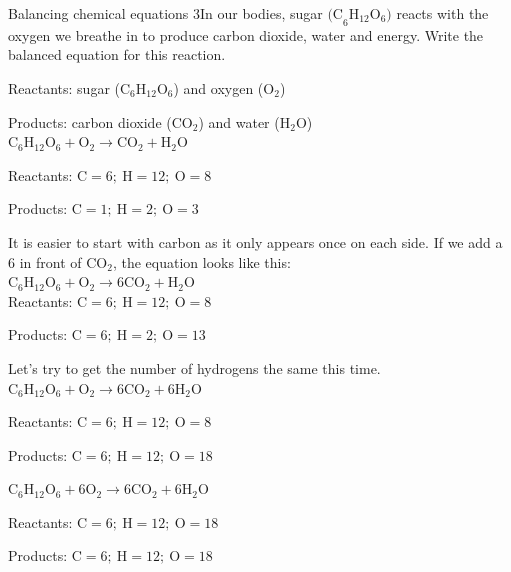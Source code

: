       \noindent
\par
            \label{m38726*secfhsst!!!underscore!!!id590}
      \noindent
\begin{wex}{Balancing chemical equations 3}{In our bodies, sugar ${\text{(C}_{6}\text{H}_{12}\text{O}_{6}\text{)}}$ reacts with the oxygen we breathe in to produce carbon dioxide, water and energy. Write the balanced equation for this reaction.}

{
Reactants: sugar (${\text{C}_{6}\text{H}_{12}\text{O}_{6}}$) and oxygen (${\text{O}_{2}}$)

Products: carbon dioxide (${\text{CO}_{2}}$) and water (${\text{H}_{2}\text{O}}$)\\

    $\text{C}_{6}\text{H}_{12}\text{O}_{6} + \text{O}_{2} \rightarrow \text{CO}_{2} + \text{H}_{2}\text{O}$

   Reactants: $\text{C} = 6;~ \text{H} = 12; ~\text{O} = 8$

   Products: $\text{C} = 1;~ \text{H} = 2; ~\text{O} = 3$

   It is easier to start with carbon as it only appears once on each side. If we add a $6$ in front of ${\text{CO}_{2}}$, the equation looks like this:\\
    $\text{C}_{6}\text{H}_{12}\text{O}_{6} + \text{O}_{2} \rightarrow 6\text{CO}_{2} + \text{H}_{2}\text{O}$\\

   Reactants: $\text{C} = 6;~ \text{H} = 12; ~\text{O} = 8$

   Products: $\text{C} = 6;~ \text{H} = 2; ~\text{O} = 13$

Let's try to get the number of hydrogens the same this time.\\
    $\text{C}_{6}\text{H}_{12}\text{O}_{6} + \text{O}_{2} \rightarrow 6\text{CO}_{2} + 6\text{H}_{2}\text{O}$

   Reactants: $\text{C} = 6;~ \text{H} = 12; ~\text{O} = 8$

   Products: $\text{C} = 6;~ \text{H} = 12; ~\text{O} = 18$

  $\text{C}_{6}\text{H}_{12}\text{O}_{6} + 6\text{O}_{2} \rightarrow 6\text{CO}_{2} + 6\text{H}_{2}\text{O}$

   Reactants: $\text{C} = 6;~ \text{H} = 12; ~\text{O} = 18$

   Products: $\text{C} = 6;~ \text{H} = 12; ~\text{O} = 18$
}
\end{wex}
